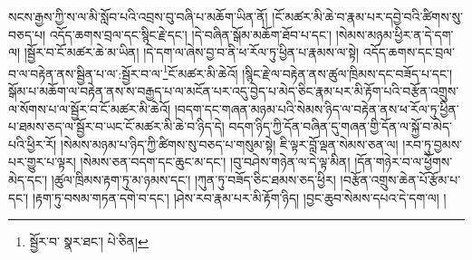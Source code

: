 སངས་རྒྱས་ཀྱི་ས་ལ་མི་སློབ་པའི་འབྲས་བུ་བཞི་པ་མཆོག་ཡིན་ནོ། །ངོ་མཚར་མི་ཆེ་བ་རྣམ་པར་དབྱེ་བའི་ཚིགས་སུ་བཅད་པ། འདོད་ཆགས་བྲལ་དང་སྙིང་རྗེ་དང་། །དེ་བཞིན་སྒོམ་མཆོག་ཐོབ་པ་དང་། །སེམས་མཉམ་ཕྱིར་ན་དེ་དག་ལ། །སྦྱོར་བ་ངོ་མཚར་ཆེ་མ་ཡིན། །དེ་དག་ལ་ཞེས་བྱ་བ་ནི་ཕ་རོལ་ཏུ་ཕྱིན་པ་རྣམས་ལ་སྟེ། འདོད་ཆགས་དང་བྲལ་བ་ལ་བརྟེན་ནས་སྦྱིན་པ་ལ་:སྦྱོར་བ་ལ་\footnote{སྦྱོར་བ་  སྣར་ཐང་།  པེ་ཅིན། }ངོ་མཚར་མི་ཆེའོ། །སྙིང་རྗེ་ལ་བརྟེན་ནས་ཚུལ་ཁྲིམས་དང་བཟོད་པ་དང་། སྒོམ་པ་མཆོག་ལ་བརྟེན་ནས་ས་བརྒྱད་པ་ལ་མངོན་པར་འདུ་བྱེད་པ་མེད་ཅིང་རྣམ་པར་མི་རྟོག་པའི་བརྩོན་འགྲུས་ལ་སོགས་པ་ལ་སྦྱོར་བ་ངོ་མཚར་མི་ཆེའོ། །བདག་དང་གཞན་མཉམ་པའི་སེམས་ཉིད་ལ་བརྟེན་ནས་ཕ་རོལ་ཏུ་ཕྱིན་པ་ཐམས་ཅད་ལ་སྦྱོར་བ་ཡང་ངོ་མཚར་མི་ཆེ་བ་ཉིད་དེ། བདག་ཉིད་ཀྱི་དོན་བཞིན་དུ་གཞན་གྱི་དོན་ལ་སྐྱོ་བ་མེད་པའི་ཕྱིར་རོ། །སེམས་མཉམ་པ་ཉིད་ཀྱི་ཚིགས་སུ་བཅད་པ་གསུམ་སྟེ། ཇི་ལྟར་བློ་ལྡན་སེམས་ཅན་ལ། །རབ་ཏུ་བྱམས་པར་གྱུར་པ་ལྟར། །སེམས་ཅན་བདག་དང་ཆུང་མ་དང་། །བུ་བཤེས་གཉེན་ལ་དེ་ལྟ་མིན། །དོན་གཉེར་བ་ལ་ཕྱོགས་མེད་དང་། །ཚུལ་ཁྲིམས་རྟག་ཏུ་མ་ཉམས་དང་། །ཀུན་ཏུ་བཟོད་ཅིང་ཐམས་ཅད་ཕྱིར། །བརྩོན་འགྲུས་ཆེན་པོ་རྩོམ་པ་དང་། །རྟག་ཏུ་བསམ་གཏན་དགེ་བ་དང་། །ཤེས་རབ་རྣམ་པར་མི་རྟོག་ཉིད། །བྱང་ཆུབ་སེམས་དཔའ་དེ་དག་ལ། །
